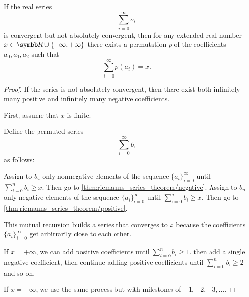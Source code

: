 \begin{theorem}\label{thm:riemanns_series_permutation_theorem}\cite[]{Фихтенгольц1968}
  If the real series
  \begin{equation*}
    \sum_{i=0}^\infty a_i
  \end{equation*}
  is convergent but not absolutely convergent, then for any extended real number \( x \in \R \cup \{ -\infty, +\infty \} \) there exists a permutation \( p \) of the coefficients \( a_0, a_1, a_2 \)
  such that
  \begin{equation*}
    \sum_{i=0}^\infty p(a_i) = x.
  \end{equation*}
\end{theorem}
\begin{proof}
  If the series is not absolutely convergent, then there exist both infinitely many positive and infinitely many negative coefficients.

  First, assume that \( x \) is finite.

  Define the permuted series
  \begin{equation*}
    \sum_{i=0}^\infty b_i
  \end{equation*}
  as follows:
  \begin{algenum}
     Assign to \( b_n \) only nonnegative elements of the sequence \( \{ a_i \}_{i=0}^\infty \) until \( \sum_{i=0}^n b_i \geq x \). Then go to \cref{thm:riemanns_series_theorem/negative}.
     Assign to \( b_n \) only negative elements of the sequence \( \{ a_i \}_{i=0}^\infty \) until \( \sum_{i=0}^n b_i \geq x \). Then go to \cref{thm:riemanns_series_theorem/positive}.
  \end{algenum}

  This mutual recursion builds a series that converges to \( x \) because the coefficients \( \{ a_i \}_{i=0}^\infty \) get arbitrarily close to each other.

  If \( x = +\infty \), we can add positive coefficients until \( \sum_{i=0}^n b_i \geq 1 \), then add a single negative coefficient, then continue adding positive coefficients until \( \sum_{i=0}^n b_i \geq 2 \) and so on.

  If \( x = -\infty \), we use the same process but with milestones of \( -1, -2, -3, \ldots \).
\end{proof}
